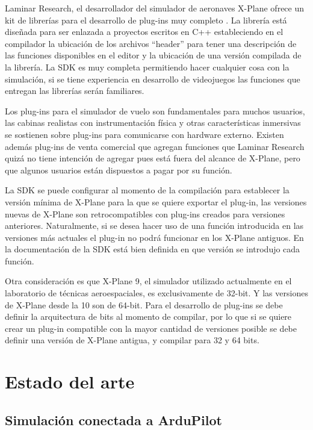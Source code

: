 Laminar Research, el desarrollador del simulador de aeronaves X-Plane ofrece un kit de librerías para el desarrollo de plug-ins muy completo \cite{xplane-sdk}. La librería está diseñada para ser enlazada a proyectos escritos en C++ estableciendo en el compilador la ubicación de los archivos ``header'' para tener una descripción de las funciones disponibles en el editor y la ubicación de una versión compilada de la librería. La SDK es muy completa permitiendo hacer cualquier cosa con la simulación, si se tiene experiencia en desarrollo de videojuegos las funciones que entregan las librerías serán familiares.

Los plug-ins para el simulador de vuelo son fundamentales para muchos usuarios, las cabinas realistas con instrumentación física y otras características inmersivas se sostienen sobre plug-ins para comunicarse con hardware externo. Existen además plug-ins de venta comercial que agregan funciones que Laminar Research quizá no tiene intención de agregar pues está fuera del alcance de X-Plane, pero que algunos usuarios están dispuestos a pagar por su función.

La SDK se puede configurar al momento de la compilación para establecer la versión mínima de X-Plane para la que se quiere exportar el plug-in, las versiones nuevas de X-Plane son retrocompatibles con plug-ins creados para versiones anteriores. Naturalmente, si se desea hacer uso de una función introducida en las versiones más actuales el plug-in no podrá funcionar en los X-Plane antiguos. En la documentación de la SDK está bien definida en que versión se introdujo cada función.

Otra consideración es que X-Plane 9, el simulador utilizado actualmente en el laboratorio de técnicas aeroespaciales, es exclusivamente de 32-bit. Y las versiones de X-Plane desde la 10 son de 64-bit. Para el desarrollo de plug-ins se debe definir la arquitectura de bits al momento de compilar, por lo que si se quiere crear un plug-in compatible con la mayor cantidad de versiones posible se debe definir una versión de X-Plane antigua, y compilar para 32 y 64 bits.

\section{Estado del arte}

\subsection{Simulación conectada a ArduPilot}

